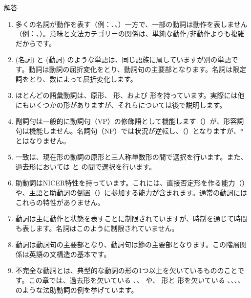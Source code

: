 \begin{tblsfilled}{解答}

\begin{enumerate}[noitemsep, leftmargin=*]
    \item 多くの名詞が動作を表す（例：、、）一方で、一部の動詞は動作を表しません（例：、）。意味と文法カテゴリーの関係は、単純な動作/非動作よりも複雑だからです。

    \item {} (名詞) と  (動詞) のような単語は、同じ語族に属していますが別の単語です。動詞は動詞の屈折変化をとり、動詞句の主要部となります。名詞は限定詞をとり、数によって屈折変化します。

    \item ほとんどの語彙動詞は、原形、 形、および  形を持っています。実際には他にもいくつかの形がありますが、それらについては後で説明します。

    \item 副詞句は一般的に動詞句（VP）の修飾語として機能します（）が、形容詞句は機能しません。名詞句（NP）では状況が逆転し、（）となりますが、* とはなりません。

    \item 一致は、現在形の動詞の原形と三人称単数形の間で選択を行います。また、過去形においては  と  の間で選択を行います。

    \item 助動詞はNICER特性を持っています。これには、直接否定形を作る能力（）や、主語と助動詞の倒置（）に参加する能力が含まれます。通常の動詞にはこれらの特性がありません。

    \item 動詞は主に動作と状態を表すことに制限されていますが、時制を通じて時間も表します。名詞はこのように制限されていません。

    \item 動詞は動詞句の主要部となり、動詞句は節の主要部となります。この階層関係は英語の文構造の基本です。

    \item 不完全な動詞とは、典型的な動詞の形の1つ以上を欠いているもののことです。この章では、過去形を欠いている 、、 や、 形と  形を欠いている 、、、、 のような法助動詞の例を挙げています。
\end{enumerate}

\end{tblsfilled}

